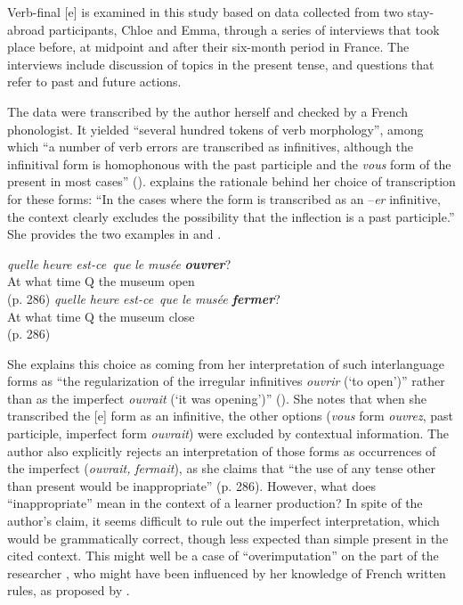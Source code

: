 \documentclass[output=paper,colorlinks,citecolor=brown,modfonts,nonflat]{../langscibook}
\begin{document}
Verb-final [e] is examined in this study based on data collected from two stay-abroad participants, Chloe and Emma, through a series of interviews that took place before, at midpoint and after their six-month period in France. The interviews include discussion of topics in the present tense, and questions that refer to past and future actions. 

The data were transcribed by the author herself and checked by a French phonologist. It yielded “several hundred tokens of verb morphology”, among which “a number of verb errors are transcribed as infinitives, although the infinitival form is homophonous with the past participle and the \textit{vous} form of the present in most cases” (\citealt[285--286]{Herschensohn2001}). \citeauthor[286]{Herschensohn2001} explains the rationale behind her choice of transcription for these forms: “In the cases where the form is transcribed as an –\textit{er} infinitive, the context clearly excludes the possibility that the inflection is a past participle.” She provides the two examples in  and .

\begin{exe}
\ex%
    \label{ex:leclerq:2}
 {\textit{quelle}} {\textit{heure}} {\textit{est-ce}}~{\textit{que}} {\textit{le}} {\textit{musée}} \textbf{{\textit{ouvrer}}}?\\
       At            what time    Q              the museum open\\
       (p. 286)
\ex%
    \label{ex:leclerq:3}
 {\textit{quelle}} {\textit{heure}} {\textit{est-ce}}~{\textit{que}} {\textit{le}} {\textit{musée}} \textbf{{\textit{fermer}}}?\\
                At what time    Q              the museum  close\\
                (p. 286)
\end{exe}

She explains this choice as coming from her interpretation of such interlanguage forms as “the regularization of the irregular infinitives \textit{ouvrir} (‘to open’)” rather than as the imperfect \textit{ouvrait} (‘it was opening’)” (\citep[286]{Herschensohn2001}). She notes that when she transcribed the [e] form as an infinitive, the other options (\textit{vous} form \textit{ouvrez}, past participle, imperfect form \textit{ouvrait}) were excluded by contextual information. The author also explicitly rejects an interpretation of those forms as occurrences of the imperfect (\textit{ouvrait,} \textit{fermait}), as she claims that “the use of any tense other than present would be inappropriate” (p. 286). However, what does “inappropriate” mean in the context of a learner production? In spite of the author’s claim, it seems difficult to rule out the imperfect interpretation, which would be grammatically correct, though less expected than simple present in the cited context. This might well be a case of “overimputation” on the part of the researcher \citep{Nickerson1999}, who might have been influenced by her knowledge of French written rules, as proposed by \citet{Jaffré2006}.
\end{document}

